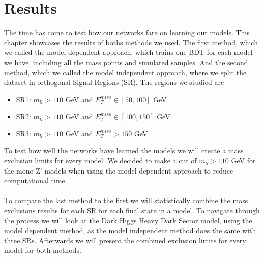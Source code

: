\documentclass[12pt, a4paper]{book}
\begin{document}
\chapter{Results}\label{chap:results}
The time has come to test how our networks fare on learning our models. This chapter showcases the results of boths methods we used. The first method, which we called the model dependent approach, which trains one BDT for each model we have, including all the mass points and simulated samples. 
And the second method, which we called the model independent approach, where we split the dataset in orthogonal Signal Regions (SR). The regions we studied are
\begin{itemize}
   \item SR1: $m_{ll} >110$ GeV and $E_T^{miss} \in [50, 100]$ GeV
   \item SR2: $m_{ll} >110$ GeV and $E_T^{miss} \in [100, 150]$ GeV
   \item SR3: $m_{ll} >110$ GeV and $E_T^{miss} >150$ GeV
\end{itemize}
To test how well the networks have learned the models we will create a mass exclusion limits for every model. We decided to make a cut of $m_{ll} >110$ GeV for the mono-Z' models when using the model dependent approach to reduce computational time.\\
\\To compare the last method to the first we will statistically combine the mass exclusions results for each SR for each final state in a model. To navigate through the process we will look at the Dark Higgs Heavy Dark Sector model, using the model dependent method, 
as the model independent method does the same with three SRs. Afterwards we will present the combined exclusion limits for every model for both methods.


\graphicspath{{../../../Plots/}}
\end{document}

